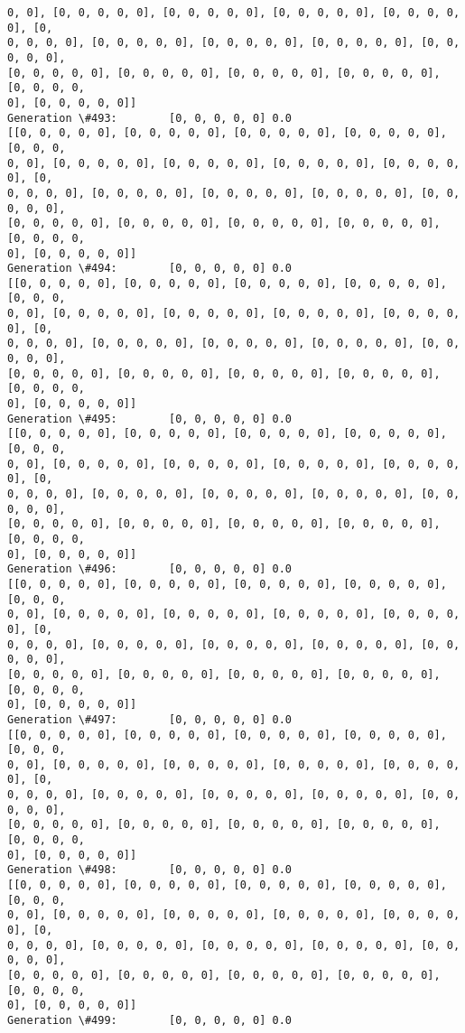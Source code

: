 \documentclass[11pt]{article}
\begin{document}
\begin{Verbatim}[commandchars=\\\{\}]
0, 0], [0, 0, 0, 0, 0], [0, 0, 0, 0, 0], [0, 0, 0, 0, 0], [0, 0, 0, 0, 0], [0,
0, 0, 0, 0], [0, 0, 0, 0, 0], [0, 0, 0, 0, 0], [0, 0, 0, 0, 0], [0, 0, 0, 0, 0],
[0, 0, 0, 0, 0], [0, 0, 0, 0, 0], [0, 0, 0, 0, 0], [0, 0, 0, 0, 0], [0, 0, 0, 0,
0], [0, 0, 0, 0, 0]]
Generation \#493:        [0, 0, 0, 0, 0] 0.0
[[0, 0, 0, 0, 0], [0, 0, 0, 0, 0], [0, 0, 0, 0, 0], [0, 0, 0, 0, 0], [0, 0, 0,
0, 0], [0, 0, 0, 0, 0], [0, 0, 0, 0, 0], [0, 0, 0, 0, 0], [0, 0, 0, 0, 0], [0,
0, 0, 0, 0], [0, 0, 0, 0, 0], [0, 0, 0, 0, 0], [0, 0, 0, 0, 0], [0, 0, 0, 0, 0],
[0, 0, 0, 0, 0], [0, 0, 0, 0, 0], [0, 0, 0, 0, 0], [0, 0, 0, 0, 0], [0, 0, 0, 0,
0], [0, 0, 0, 0, 0]]
Generation \#494:        [0, 0, 0, 0, 0] 0.0
[[0, 0, 0, 0, 0], [0, 0, 0, 0, 0], [0, 0, 0, 0, 0], [0, 0, 0, 0, 0], [0, 0, 0,
0, 0], [0, 0, 0, 0, 0], [0, 0, 0, 0, 0], [0, 0, 0, 0, 0], [0, 0, 0, 0, 0], [0,
0, 0, 0, 0], [0, 0, 0, 0, 0], [0, 0, 0, 0, 0], [0, 0, 0, 0, 0], [0, 0, 0, 0, 0],
[0, 0, 0, 0, 0], [0, 0, 0, 0, 0], [0, 0, 0, 0, 0], [0, 0, 0, 0, 0], [0, 0, 0, 0,
0], [0, 0, 0, 0, 0]]
Generation \#495:        [0, 0, 0, 0, 0] 0.0
[[0, 0, 0, 0, 0], [0, 0, 0, 0, 0], [0, 0, 0, 0, 0], [0, 0, 0, 0, 0], [0, 0, 0,
0, 0], [0, 0, 0, 0, 0], [0, 0, 0, 0, 0], [0, 0, 0, 0, 0], [0, 0, 0, 0, 0], [0,
0, 0, 0, 0], [0, 0, 0, 0, 0], [0, 0, 0, 0, 0], [0, 0, 0, 0, 0], [0, 0, 0, 0, 0],
[0, 0, 0, 0, 0], [0, 0, 0, 0, 0], [0, 0, 0, 0, 0], [0, 0, 0, 0, 0], [0, 0, 0, 0,
0], [0, 0, 0, 0, 0]]
Generation \#496:        [0, 0, 0, 0, 0] 0.0
[[0, 0, 0, 0, 0], [0, 0, 0, 0, 0], [0, 0, 0, 0, 0], [0, 0, 0, 0, 0], [0, 0, 0,
0, 0], [0, 0, 0, 0, 0], [0, 0, 0, 0, 0], [0, 0, 0, 0, 0], [0, 0, 0, 0, 0], [0,
0, 0, 0, 0], [0, 0, 0, 0, 0], [0, 0, 0, 0, 0], [0, 0, 0, 0, 0], [0, 0, 0, 0, 0],
[0, 0, 0, 0, 0], [0, 0, 0, 0, 0], [0, 0, 0, 0, 0], [0, 0, 0, 0, 0], [0, 0, 0, 0,
0], [0, 0, 0, 0, 0]]
Generation \#497:        [0, 0, 0, 0, 0] 0.0
[[0, 0, 0, 0, 0], [0, 0, 0, 0, 0], [0, 0, 0, 0, 0], [0, 0, 0, 0, 0], [0, 0, 0,
0, 0], [0, 0, 0, 0, 0], [0, 0, 0, 0, 0], [0, 0, 0, 0, 0], [0, 0, 0, 0, 0], [0,
0, 0, 0, 0], [0, 0, 0, 0, 0], [0, 0, 0, 0, 0], [0, 0, 0, 0, 0], [0, 0, 0, 0, 0],
[0, 0, 0, 0, 0], [0, 0, 0, 0, 0], [0, 0, 0, 0, 0], [0, 0, 0, 0, 0], [0, 0, 0, 0,
0], [0, 0, 0, 0, 0]]
Generation \#498:        [0, 0, 0, 0, 0] 0.0
[[0, 0, 0, 0, 0], [0, 0, 0, 0, 0], [0, 0, 0, 0, 0], [0, 0, 0, 0, 0], [0, 0, 0,
0, 0], [0, 0, 0, 0, 0], [0, 0, 0, 0, 0], [0, 0, 0, 0, 0], [0, 0, 0, 0, 0], [0,
0, 0, 0, 0], [0, 0, 0, 0, 0], [0, 0, 0, 0, 0], [0, 0, 0, 0, 0], [0, 0, 0, 0, 0],
[0, 0, 0, 0, 0], [0, 0, 0, 0, 0], [0, 0, 0, 0, 0], [0, 0, 0, 0, 0], [0, 0, 0, 0,
0], [0, 0, 0, 0, 0]]
Generation \#499:        [0, 0, 0, 0, 0] 0.0

\end{Verbatim}
\end{document}
